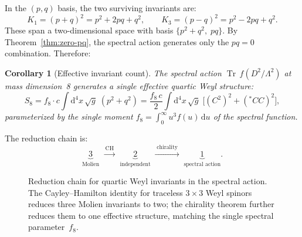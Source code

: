 \documentclass[12pt,a4paper]{article}
\newtheorem{corollary}[theorem]{Corollary}
\theoremstyle{definition}
\theoremstyle{remark}
\newcommand{\dd}{\mathrm{d}}
\newcommand{\Tr}{\operatorname{Tr}}
\newcommand{\Lam}{\Lambda}
\begin{document}
In the $(p, q)$ basis, the two surviving invariants are:
\begin{equation}
  K_1 = (p + q)^2 = p^2 + 2pq + q^2, \qquad
  K_3 = (p - q)^2 = p^2 - 2pq + q^2.
\end{equation}
These span a two-dimensional space with basis $\{p^2 + q^2,\; pq\}$.
By Theorem~\ref{thm:zero-pq}, the spectral action generates only the
$pq = 0$ combination.  Therefore:

\begin{corollary}[Effective invariant count]
\label{cor:one-invariant}
The spectral action $\Tr\,f(D^2/\Lam^2)$ at mass dimension~8 generates
a single effective quartic Weyl structure:
\begin{equation}\label{eq:one-structure}
  S_8 = f_8 \cdot c \int \dd^4x\,\sqrt{g}\;(p^2 + q^2)
  = \frac{f_8\,c}{2}\int \dd^4x\,\sqrt{g}\;
  \bigl[(C^2)^2 + ({}^{\ast}\!CC)^2\bigr],
\end{equation}
parameterized by the single moment $f_8 = \int_0^\infty u^3 f(u)\,\dd u$ of
the spectral function.
\end{corollary}

\noindent The reduction chain is:
\begin{equation}\label{eq:chain}
  \underbrace{3}_{\text{Molien}}
  \;\xrightarrow{\;\text{CH}\;}\;
  \underbrace{2}_{\text{independent}}
  \;\xrightarrow{\;\text{chirality}\;}\;
  \underbrace{1}_{\text{spectral action}}.
\end{equation}

\begin{figure}[ht]
\centering
{}
\caption{Reduction chain for quartic Weyl invariants in the spectral action.
The Cayley--Hamilton identity for traceless $3 \times 3$ Weyl spinors
reduces three Molien invariants to two; the chirality theorem further
reduces them to one effective structure, matching the single spectral
parameter~$f_8$.}
\label{fig:reduction-chain}
\end{figure}
\end{document}
